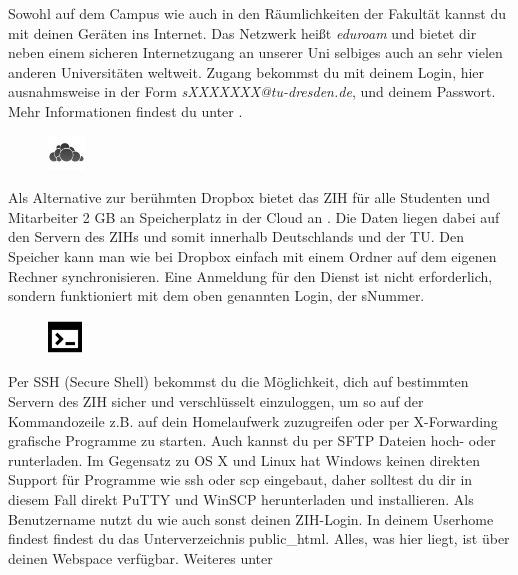Sowohl auf dem Campus wie auch in den Räumlichkeiten der Fakultät kannst du mit deinen Geräten ins Internet.
Das Netzwerk heißt \textit{eduroam} und bietet dir neben einem sicheren Internetzugang an unserer Uni selbiges auch an sehr vielen anderen Universitäten weltweit.
Zugang bekommst du mit deinem Login, hier ausnahmsweise in der Form \textit{sXXXXXXX@tu-dresden.de}, und deinem Passwort. Mehr Informationen findest du unter .

\newpage


\begin{figure}%
  \vspace{-0.5cm}%
  \centering%
  \includegraphics[width=1cm]{img/icons/owncloud.png}%
  \vspace{-0.5cm}%
\end{figure}

Als Alternative zur berühmten Dropbox bietet das ZIH für alle Studenten und Mitarbeiter 2 GB an Speicherplatz in der Cloud an . Die Daten liegen dabei auf den Servern des ZIHs und somit innerhalb Deutschlands und der TU. Den Speicher kann man wie bei Dropbox einfach mit einem Ordner auf dem eigenen Rechner synchronisieren. Eine Anmeldung für den Dienst ist nicht erforderlich, sondern funktioniert mit dem oben genannten Login, der sNummer.


\begin{figure}%
  \vspace{-0.4cm}%
  \centering%
  \includegraphics[width=0.9cm]{img/icons/prompt.pdf}%
  \vspace{-0.4cm}%
\end{figure}

Per SSH (Secure Shell) bekommst du die Möglichkeit, dich auf bestimmten Servern des ZIH sicher und verschlüsselt einzuloggen, um so auf der Kommandozeile z.B. auf dein Homelaufwerk zuzugreifen oder per X-Forwarding grafische Programme zu starten.
Auch kannst du per SFTP Dateien hoch- oder runterladen.
Im Gegensatz zu OS X und Linux hat Windows keinen direkten Support für Programme wie ssh oder scp eingebaut, daher solltest du dir in diesem Fall direkt PuTTY und WinSCP herunterladen und installieren.
Als Benutzername nutzt du wie auch sonst deinen ZIH-Login.
In deinem Userhome findest findest du das Unterverzeichnis public\_html.
Alles, was hier liegt, ist über deinen Webspace verfügbar. 
Weiteres unter 
\vfill

